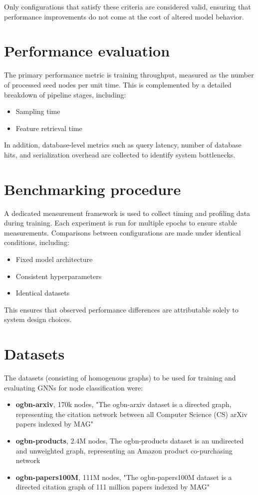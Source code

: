 \documentclass[ oneside,openright,titlepage,numbers=noenddot,headinclude,%
                footinclude=true,cleardoublepage=empty,abstractoff, %
                BCOR=0mm,paper=a4,fontsize=11pt,%
                ngerman,american,%
                ]{scrreprt}
\begin{document}
Only configurations that satisfy these criteria are considered valid, ensuring that performance improvements do not come at the cost of altered model behavior.


\section{Performance evaluation}
The primary performance metric is training throughput, measured as the number of processed seed nodes per unit time. This is complemented by a detailed breakdown of pipeline stages, including:
\begin{itemize}
    \item Sampling time
    \item Feature retrieval time
\end{itemize}
In addition, database-level metrics such as query latency, number of database hits, and serialization overhead are collected to identify system bottlenecks.

\section{Benchmarking procedure}
A dedicated measurement framework is used to collect timing and profiling data during training. Each experiment is run for multiple epochs to ensure stable measurements.
Comparisons between configurations are made under identical conditions, including:

\begin{itemize}
    \item Fixed model architecture
    \item Consistent hyperparameters
    \item Identical datasets
\end{itemize}

This ensures that observed performance differences are attributable solely to system design choices.

\section{Datasets}
The datasets (consisting of homogenous graphs) to be used for training and evaluating GNNs for node classification were:

\begin{itemize}
    \item \textbf{ogbn-arxiv}, 170k nodes, "The ogbn-arxiv dataset is a directed graph, representing the citation network between all Computer Science (CS) arXiv papers indexed by MAG"
    \item \textbf{ogbn-products}, 2.4M nodes, The ogbn-products dataset is an undirected and unweighted graph, representing an Amazon product co-purchasing network
    \item \textbf{ogbn-papers100M}, 111M nodes, "The ogbn-papers100M dataset is a directed citation graph of 111 million papers indexed by MAG"
\end{itemize}
\end{document}
